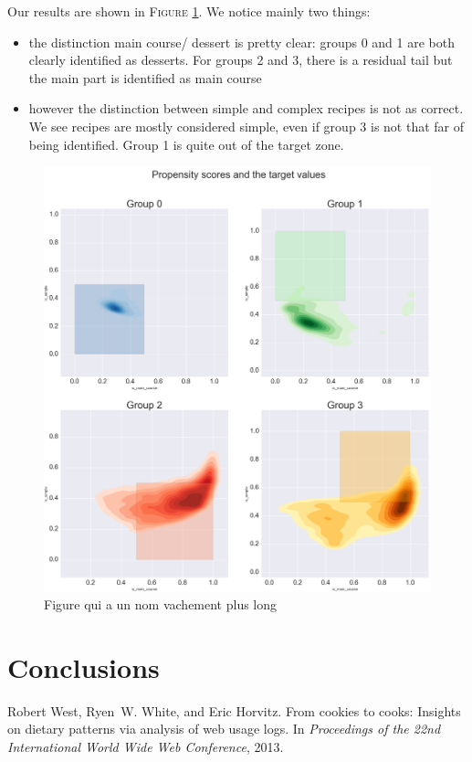 \documentclass[11pt]{article}
\begin{document}
Our results are shown in \textsc{Figure} \ref{fig:end}. We notice mainly two things:
\begin{itemize}
\item the distinction main course/ dessert is pretty clear: groups 0 and 1 are both clearly identified as desserts. For groups 2 and 3, there is a residual tail but the main part is identified as main course
\item however the distinction between simple and complex recipes is not as correct. We see recipes are mostly considered simple, even if group 3 is not that far of being identified. Group 1 is quite out of the target zone.
\end{itemize}
\clearpage
\begin{figure}[!h]
	\includegraphics[width=\textwidth]{../propensity-r.png}
	\caption{Figure qui a un nom vachement plus long}
	\label{fig:end}
\end{figure}
\section{Conclusions}

\begin{thebibliography}{}
	
	Robert West, Ryen~W. White, and Eric Horvitz.
	\newblock From cookies to cooks: Insights on dietary patterns via analysis of
	web usage logs.
	\newblock In {\em Proceedings of the 22nd International World Wide Web
		Conference}, 2013.
	
\end{thebibliography}
\end{document}

